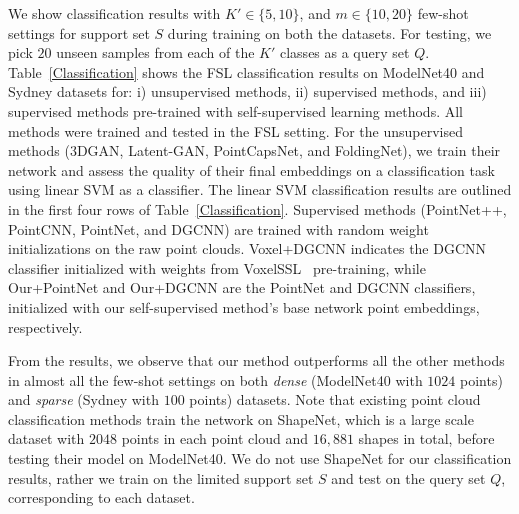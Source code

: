 \documentclass{article}
\begin{document}
We show classification results with $K' \in \{5,10\}$, and $m \in \{10,20\}$ few-shot settings for support set $S$ during training on both the datasets. For testing, we pick $20$ unseen samples from each of the $K'$ classes as a query set $Q$. 
Table~\ref{Classification} shows the FSL classification results on ModelNet40 and Sydney datasets for: i) unsupervised methods, ii) supervised methods, and iii) supervised methods pre-trained with self-supervised learning methods. 
All methods were trained and tested in the FSL setting.
For the unsupervised methods (3DGAN, Latent-GAN, PointCapsNet, and FoldingNet), we train their network and assess the quality of their final embeddings on a classification task using linear SVM as a classifier. The linear SVM classification results are outlined in the first four rows of Table~\ref{Classification}. Supervised methods (PointNet++, PointCNN, PointNet, and DGCNN) are trained with random weight initializations on the raw point clouds. Voxel+DGCNN indicates the DGCNN classifier initialized with weights from VoxelSSL~\cite{sauder2019self} pre-training, while Our+PointNet and Our+DGCNN are the PointNet and DGCNN classifiers, initialized with our self-supervised method's base network point embeddings, respectively.  

From the results, we observe that our method outperforms all the other methods in almost all the few-shot settings on both \emph{dense} (ModelNet40 with $1024$ points) and \emph{sparse} (Sydney with $100$ points) datasets. Note that existing point cloud classification methods train the network on ShapeNet, which is a large scale dataset with $2048$ points in each point cloud and $16,881$ shapes in total, before testing their model on ModelNet40. We do not use ShapeNet for our classification results, rather we train on the limited support set $S$ and test on the query set $Q$,
corresponding to each dataset. 
\end{document}
